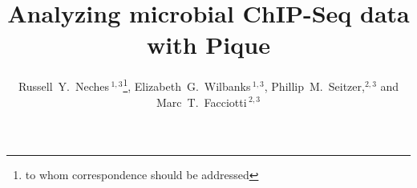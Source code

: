\documentclass{bioinfo}
\begin{document}

\title[In a fit of pique]{Analyzing microbial ChIP-Seq data with
  Pique} \author[Neches
\textit{et~al}]{Russell~Y.~Neches\,$^{1,3}$\footnote{to whom
    correspondence should be addressed},
  Elizabeth~G.~Wilbanks\,$^{1,3}$, Phillip~M.~Seitzer,$^{2,3}$ and
  Marc~T.~Facciotti\,$^{2,3}$
  \address{$^{1}$Microbiology Graduate Group, University of California, Davis.\\
    $^{2}$Department of Biomedical Engineering, University of
    California, Davis.\\$^{3}$Genome Center, University of California,
    Davis.}}



\maketitle

\newcommand{\imsize}{1.0\columnwidth}
\end{document}
